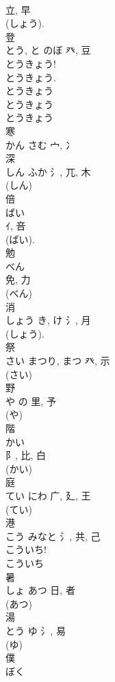 \documentclass[8pt]{extreport}
\begin{document}
\begin{CJK}{UTF8}{min}
\\	立, 早	
\\	(しょう). 
\\	登	
\\	とう, と	のぼ	癶, 豆	
\\	とうきょう! 
\\	とうきょう. 
\\	とうきょう 
\\	とうきょう 
\\	とうきょう 
\\	寒	
\\	かん	さむ	宀, 冫		
\\	深	
\\	しん	ふか	氵, 兀, 木	
\\	(しん) 
\\	倍	
\\	ばい	
\\	ｲ, 咅	
\\	(ばい). 
\\	勉	
\\	べん	
\\	免, 力	
\\	(べん) 
\\	消	
\\	しょう	き, け	氵, 月		
\\	(しょう). 
\\	祭	
\\	さい	まつり, まつ	癶, 示	
\\	(さい) 
\\	野	
\\	や	の	里, 予	
\\	(や) 
\\	階	
\\	かい	
\\	阝, 比, 白	
\\	(かい) 
\\	庭	
\\	てい	にわ	广, 廴, 王	
\\	(てい) 
\\	港	
\\	こう	みなと	氵, 共, 己	
\\	こういち! 
\\	こういち 
\\	暑	
\\	しょ	あつ	日, 者	
\\	(あつ) 
\\	湯	
\\	とう	ゆ	氵, 易	
\\	(ゆ) 
\\	僕	
\\	ぼく	

\end{CJK}
\end{document}
